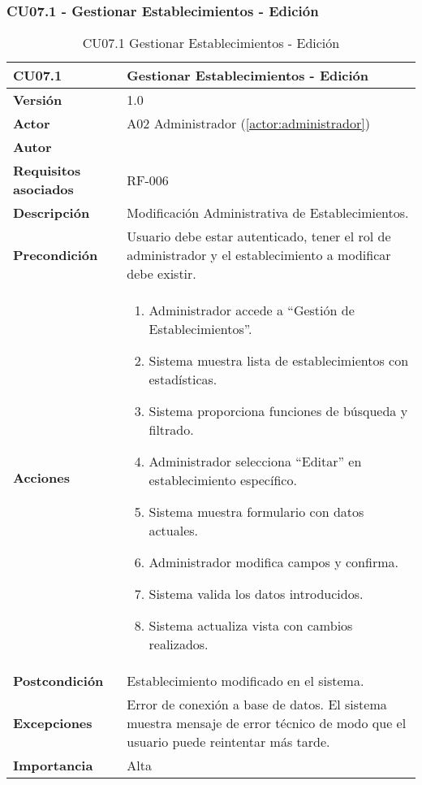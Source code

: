 \subsubsection{CU07.1 - Gestionar Establecimientos - Edición}

\begin{table}[H]
	\centering
	\begin{tabularx}{\linewidth}{ p{} p{} }
		\toprule
		\textbf{CU07.1}    & \textbf{Gestionar Establecimientos - Edición} \\
		\toprule
		\textbf{Versión}              & 1.0    \\
		\textbf{Actor}                & A02 Administrador (\ref{actor:administrador}) \\
		\textbf{Autor}                & \nombre \\
		\textbf{Requisitos asociados} & RF-006 \\
		\textbf{Descripción}          & Modificación Administrativa de Establecimientos. \\
		\textbf{Precondición}         & Usuario debe estar autenticado, tener el rol de administrador y el establecimiento a modificar debe existir. \\
		\textbf{Acciones}             &
		\begin{enumerate}
			\def\labelenumi{\arabic{enumi}.}
			\tightlist
			\item Administrador accede a ``Gestión de Establecimientos''.
            \item Sistema muestra lista de establecimientos con estadísticas.
            \item Sistema proporciona funciones de búsqueda y filtrado.
            \item Administrador selecciona ``Editar'' en establecimiento específico.
 	    \item Sistema muestra formulario con datos actuales.
            \item Administrador modifica campos y confirma.
            \item Sistema valida los datos introducidos.
            \item Sistema actualiza vista con cambios realizados.
		\end{enumerate}\\
		\textbf{Postcondición}        & Establecimiento modificado en el sistema.\\
		\textbf{Excepciones}          & Error de conexión a base de datos. El sistema muestra mensaje de error técnico de modo que el usuario puede reintentar más tarde.\\
		\textbf{Importancia}          & Alta \\
		\bottomrule
	\end{tabularx}
	\caption{CU07.1 Gestionar Establecimientos - Edición}
	\label{cu:gestionar-establecimientos-edicion}
\end{table}


